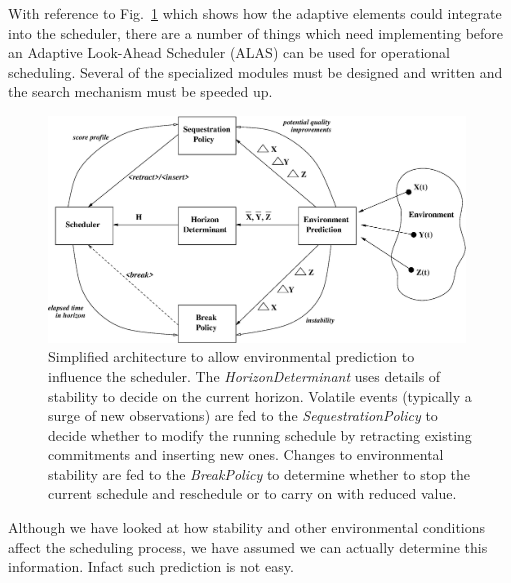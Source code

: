 With reference to Fig.~\ref{fig:las_feedback} which shows how the adaptive elements could integrate into the scheduler, there are a number of things which need implementing before an Adaptive Look-Ahead Scheduler (ALAS) can be used for operational scheduling. Several of the specialized modules must be designed and written and the search mechanism must be speeded up.


   \begin{figure}[htp]
   \begin{center}
   \includegraphics[height=6cm]{figures/las_feedback.eps}
   \end{center}
 
   \caption[Environmental prediction in scheduling architecture.] 
   {Simplified architecture to allow environmental prediction to influence the scheduler. The \emph{HorizonDeterminant} uses details of stability to decide on the current horizon. Volatile events (typically a surge of new observations) are fed to the \emph{SequestrationPolicy} to decide whether to modify the running schedule by retracting existing commitments and inserting new ones. Changes to environmental stability are fed to the \emph{BreakPolicy} to determine whether to stop the current schedule and reschedule or to carry on with reduced value.}
   \label{fig:las_feedback} 
   \end{figure} 


 Although we have looked at how stability and other environmental conditions affect the scheduling process, we have assumed we can actually determine this information. Infact such prediction is not easy.


